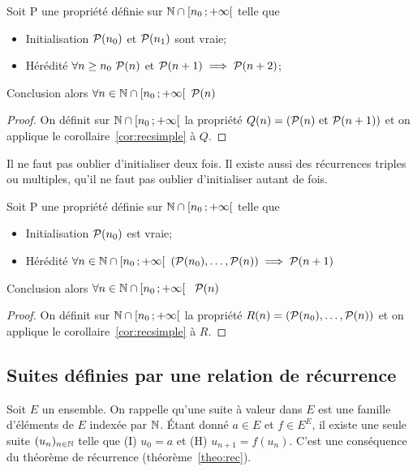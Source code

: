 \begin{cor}
  \label{cor:recdouble}
  Soit P une propriété définie sur $\N\cap \intervallefo{n_0}{+\infty}$ telle que
 \begin{itemize}
  \item Initialisation $\P(n_0)$ et $\P(n_1)$ sont vraie;
  \item Hérédité $\forall n\geq n_0 \ \P(n)$ et $\P(n+1) \implies \P(n+2)$;
  \end{itemize}
  Conclusion alors $\forall n \in \N\cap \intervallefo{n_0}{+\infty} \ \P(n)$ 
\end{cor}
\begin{proof}
  On définit sur $\N\cap \intervallefo{n_0}{+\infty}$ la propriété $Q(n)=(\P(n) \text{ et } \P(n+1))$ et on applique le corollaire~\ref{cor:recsimple} à $Q$.
\end{proof}
Il ne faut pas oublier d'initialiser deux fois. Il existe aussi des récurrences triples ou multiples, qu'il ne faut pas oublier d'initialiser autant de fois.
\begin{cor}
  \label{cor:recforte}
  Soit P une propriété définie sur $\N\cap \intervallefo{n_0}{+\infty}$ telle que
  \begin{itemize}
  \item Initialisation $\P(n_0)$ est vraie;
  \item Hérédité $\forall n \in \N\cap \intervallefo{n_0}{+\infty} \ (\P(n_0), \ldots, \P(n)) \implies \P(n+1)$
  \end{itemize}
  Conclusion alors $\forall n \in \N\cap \intervallefo{n_0}{+\infty}\ \ \P(n)$
\end{cor}
\begin{proof}
  On définit sur $\N\cap \intervallefo{n_0}{+\infty}$ la propriété $R(n)=(\P(n_0), \ldots, \P(n))$ et on applique le corollaire~\ref{cor:recsimple} à $R$.
\end{proof}

\subsection{Suites définies par une relation de récurrence}

Soit $E$ un ensemble. On rappelle qu'une suite à valeur dans $E$ est une famille d'éléments de $E$ indexée par $\N$. Étant donné $a\in E$ et $f\in E^E$, il existe une seule suite $(u_n)_{n\in\N}$ telle que (I) $u_0=a$ et (H) $u_{n+1}=f(u_n)$. C'est une conséquence du théorème de récurrence (théorème~\ref{theo:rec}).


